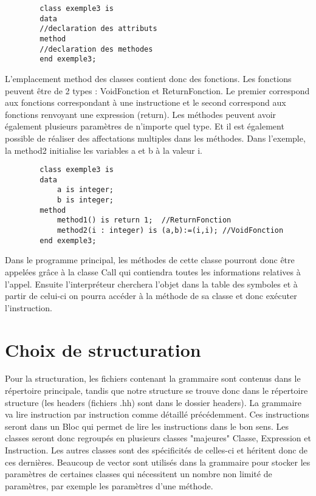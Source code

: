 \documentclass{report}
\begin{document}
	\begin{lstlisting}
		class exemple3 is
		data
		//declaration des attributs
		method
		//declaration des methodes
		end exemple3;
	\end{lstlisting}
	\par 
	L'emplacement method des classes contient donc des fonctions. Les fonctions peuvent être de 2 types : VoidFonction et ReturnFonction. Le premier correspond aux fonctions correspondant à une instructione et le second correspond aux fonctions renvoyant une expression (return). Les méthodes peuvent avoir également plusieurs paramètres de n'importe quel type. Et il est également possible de réaliser des affectations multiples dans les méthodes. Dans l'exemple, la method2 initialise les variables a et b à la valeur i.
	\begin{lstlisting}
		class exemple3 is
		data
			a is integer;
			b is integer;
		method
			method1() is return 1;	//ReturnFonction
			method2(i : integer) is (a,b):=(i,i); //VoidFonction
		end exemple3;
	\end{lstlisting}
	Dans le programme principal, les méthodes de cette classe pourront donc être appelées grâce à la classe Call qui contiendra toutes les informations relatives à l'appel. Ensuite l'interpréteur cherchera l'objet dans la table des symboles et à partir de celui-ci on pourra accéder à la méthode de sa classe et donc exécuter l'instruction.
	\section{Choix de structuration}
	Pour la structuration, les fichiers contenant la grammaire sont contenus dans le répertoire principale, tandis que notre structure se trouve donc dans le répertoire structure (les headers (fichiers .hh) sont dans le dossier headers). La grammaire va lire instruction par instruction comme détaillé précédemment. Ces instructions seront dans un Bloc qui permet de lire les instructions dans le bon sens. Les classes seront donc regroupés en plusieurs classes "majeures" Classe, Expression et Instruction. Les autres classes sont des spécificités de celles-ci et héritent donc de ces dernières. Beaucoup de vector sont utilisés dans la grammaire pour stocker les paramètres de certaines classes qui nécessitent un nombre non limité de paramètres, par exemple les paramètres d'une méthode.
\end{document}
